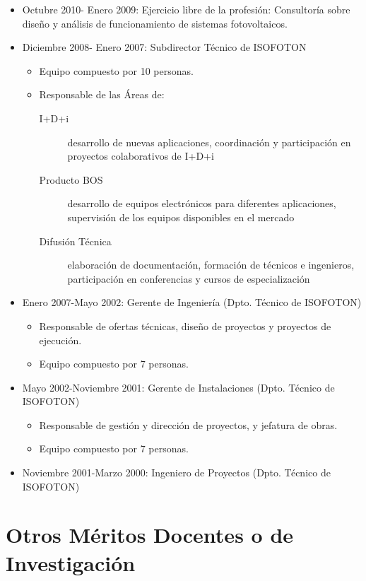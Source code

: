 \documentclass[article, a4paper]{memoir}
\begin{document}
\begin{itemize}
\item Octubre 2010- Enero 2009: Ejercicio libre de la profesión:
Consultoría sobre diseño y análisis de funcionamiento de sistemas fotovoltaicos.

\item Diciembre 2008- Enero 2007: Subdirector Técnico de ISOFOTON
\begin{itemize}
\item Equipo compuesto por 10 personas.
\item Responsable de las Áreas de:
\begin{description}
\item[{I+D+i}] desarrollo de nuevas aplicaciones, coordinación y participación en proyectos colaborativos de I+D+i
\item[{Producto BOS}] desarrollo de equipos electrónicos para diferentes aplicaciones, supervisión de los equipos disponibles en el mercado
\item[{Difusión Técnica}] elaboración de documentación, formación de técnicos e ingenieros, participación en conferencias y cursos de especialización
\end{description}
\end{itemize}

\item Enero 2007-Mayo 2002: Gerente de Ingeniería (Dpto. Técnico de ISOFOTON)
\begin{itemize}
\item Responsable de ofertas técnicas, diseño de proyectos y proyectos de ejecución.
\item Equipo compuesto por 7 personas.
\end{itemize}

\item Mayo 2002-Noviembre 2001: Gerente de Instalaciones (Dpto. Técnico de ISOFOTON)
\begin{itemize}
\item Responsable de gestión y dirección de proyectos, y jefatura de obras.
\item Equipo compuesto por 7 personas.
\end{itemize}

\item Noviembre 2001-Marzo 2000: Ingeniero de Proyectos (Dpto. Técnico de ISOFOTON)
\end{itemize}



\section{Otros Méritos Docentes o de Investigación}
\label{sec-15}
\end{document}
